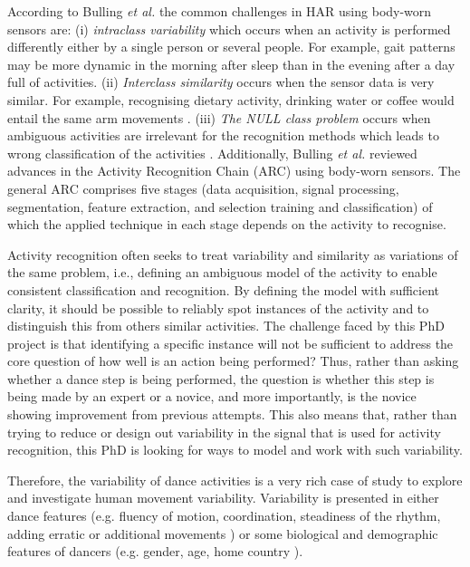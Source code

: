 \documentclass[10pt,journal,compsoc]{IEEEtran}
\begin{document}
According to Bulling \textit{et al.} \cite{bulling2014} the common challenges in HAR
using body-worn sensors are: 
(i) \textit{intraclass variability} which occurs when an activity is performed differently 
either by a single person or several people. For example, gait patterns may be more
dynamic in the morning after sleep than in the evening after a day full of activities.
(ii) \textit{Interclass similarity} occurs when the sensor data is very similar. For example,
recognising dietary activity, drinking water or coffee would entail the same arm movements 
\cite{amft2008phd}. (iii) \textit{The NULL class problem} occurs 
when ambiguous activities are irrelevant for the recognition methods
which leads to wrong classification of the activities \cite{amft2011}.
Additionally, Bulling \textit{et al.} \cite{bulling2014} reviewed advances in the Activity
Recognition Chain (ARC) using body-worn sensors. The general ARC comprises five stages
(data acquisition, signal processing, segmentation, feature extraction, and selection
training and classification) of which the applied technique in each stage depends on the
activity to recognise.

Activity recognition often seeks to treat variability and 
similarity as variations of the same problem, i.e., defining 
an ambiguous model of the activity to enable consistent
classification and recognition. By defining the model 
with sufficient clarity, it should be possible to reliably spot 
instances of the activity and to distinguish this from others
similar activities. The challenge faced by this PhD project 
is that identifying a specific instance will not be sufficient
to address the core question of how well is an action being performed?
Thus, rather than asking whether a dance step is being performed,
the question is whether this step is being made by an expert or a novice,
and more importantly, is the novice showing improvement from 
previous attempts. This 
also means that, rather than trying to reduce or design out
variability in the signal that is used for activity recognition,
this PhD is looking for ways to model and work with such
variability.

Therefore, the variability of dance activities is a very rich 
case of study to explore and investigate human 
movement variability. Variability is presented in either dance 
features (e.g. fluency of motion, coordination, steadiness of 
the rhythm, adding erratic or additional movements \cite{Grammer2011, Aristidou2014}) 
or some biological and demographic features of dancers 
(e.g. gender, age, home country \cite{Grammer2011, Iwai2011}). 
\end{document}
